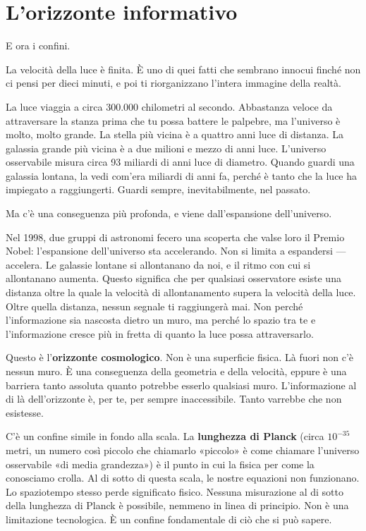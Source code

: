 \documentclass[11pt, twoside, openright]{book}
\begin{document}
\section*{L'orizzonte informativo}

E ora i confini.

La velocità della luce è finita. È uno di quei fatti che sembrano innocui finché non ci pensi per dieci minuti, e poi ti riorganizzano l'intera immagine della realtà.

La luce viaggia a circa 300.000 chilometri al secondo. Abbastanza veloce da attraversare la stanza prima che tu possa battere le palpebre, ma l'universo è molto, molto grande. La stella più vicina è a quattro anni luce di distanza. La galassia grande più vicina è a due milioni e mezzo di anni luce. L'universo osservabile misura circa 93 miliardi di anni luce di diametro. Quando guardi una galassia lontana, la vedi com'era miliardi di anni fa, perché è tanto che la luce ha impiegato a raggiungerti. Guardi sempre, inevitabilmente, nel passato.

Ma c'è una conseguenza più profonda, e viene dall'espansione dell'universo.

Nel 1998, due gruppi di astronomi fecero una scoperta che valse loro il Premio Nobel: l'espansione dell'universo sta accelerando. Non si limita a espandersi --- accelera. Le galassie lontane si allontanano da noi, e il ritmo con cui si allontanano aumenta. Questo significa che per qualsiasi osservatore esiste una distanza oltre la quale la velocità di allontanamento supera la velocità della luce. Oltre quella distanza, nessun segnale ti raggiungerà mai. Non perché l'informazione sia nascosta dietro un muro, ma perché lo spazio tra te e l'informazione cresce più in fretta di quanto la luce possa attraversarlo.

Questo è l'\textbf{orizzonte cosmologico}. Non è una superficie fisica. Là fuori non c'è nessun muro. È una conseguenza della geometria e della velocità, eppure è una barriera tanto assoluta quanto potrebbe esserlo qualsiasi muro. L'informazione al di là dell'orizzonte è, per te, per sempre inaccessibile. Tanto varrebbe che non esistesse.

C'è un confine simile in fondo alla scala. La \textbf{lunghezza di Planck} (circa $10^{-35}$ metri, un numero così piccolo che chiamarlo «piccolo» è come chiamare l'universo osservabile «di media grandezza») è il punto in cui la fisica per come la conosciamo crolla. Al di sotto di questa scala, le nostre equazioni non funzionano. Lo spaziotempo stesso perde significato fisico. Nessuna misurazione al di sotto della lunghezza di Planck è possibile, nemmeno in linea di principio. Non è una limitazione tecnologica. È un confine fondamentale di ciò che si può sapere.
\end{document}
